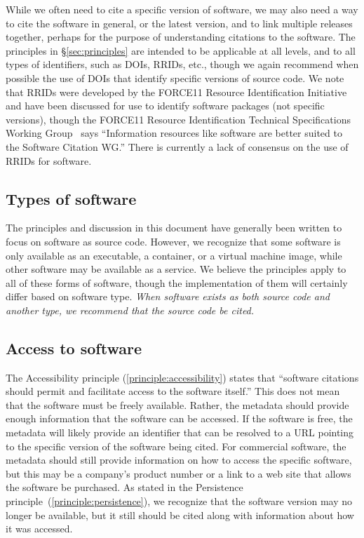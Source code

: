 \documentclass[12pt, oneside]{amsart}
\begin{document}
While we often need to cite a specific version of software, we may also need a way to cite the
software in general, or the latest version, and to link multiple releases together, perhaps for
the purpose of understanding citations to the software.  The principles in \S\ref{sec:principles} are
intended to be applicable at all levels, and to all types of identifiers, such as DOIs, RRIDs, etc.,
though we again recommend when possible the use of DOIs that identify specific versions of
source code.  We note that RRIDs were developed by the FORCE11 Resource Identification Initiative~\cite{f11rii}
and have been discussed for use to identify software packages (not specific versions),
though the FORCE11 Resource Identification Technical Specifications Working
Group~\cite{f11rrridtswg} says ``Information resources like software are better suited to
the Software Citation WG.''
There is currently a lack of consensus on the use of RRIDs for software.

\subsection{Types of software}

The principles and discussion in this document have generally been written to focus on software
as source code.  However, we recognize that some software is only available as an executable, a container, or a virtual machine image, while other software may be available as a service.  We believe the principles apply to all of these forms of software, though the implementation of them will certainly differ based on software type.  
\textit{When software exists as both source code and another type, we recommend that the source code be cited.}


\subsection{Access to software}
\label{sec:access}

The Accessibility principle (\ref{principle:accessibility}) states that ``software citations should permit and facilitate access to the software itself.''
This does not mean that the software must be freely available.
Rather, the metadata should provide enough information that the software can be accessed.
If the software is free, the metadata will likely provide an identifier that can be resolved to a URL pointing to the specific version of the software being cited.
For commercial software, the metadata should still provide information on how to access the specific software, but this may be a company's product number or a link to a web site that allows the software be purchased.
As stated in the Persistence principle~(\ref{principle:persistence}), we recognize that the software version may no longer be available, but it still should be cited along with information about how it was accessed.
\end{document}
